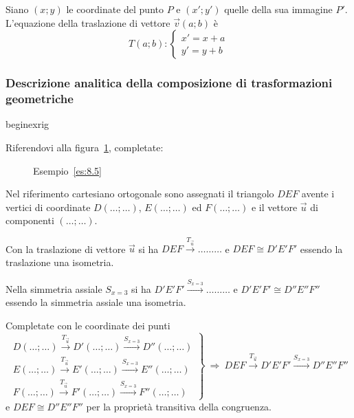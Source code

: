 Siano $(x;y)$ le coordinate del punto $P$ e $(x';y')$ quelle della 
sua immagine $P'$. L'equazione della traslazione di vettore 
$\vec{v}(a;b)$ è
\[T(a;b):\begin{cases}x'=x+a\\y'=y+b\end{cases}\]

\subsubsection{\textbf{Descrizione analitica della composizione di 
trasformazioni geometriche}}
begin{exrig}
\begin{esempio}\label{es:8.5}
Riferendovi alla figura~\ref{fig:es8.5}, completate:


\begin{inaccessibleblock}
\begin{figure}[!htb]
\centering
\caption{Esempio~\ref{es:8.5}}\label{fig:es8.5}
\end{figure}
\end{inaccessibleblock}

Nel riferimento cartesiano ortogonale sono assegnati il triangolo 
$DEF$ avente i vertici di coordinate $D(\ldots{};\ldots{})$, 
$E(\ldots{};\ldots{})$ ed $F(\ldots{};\ldots{})$ e il vettore 
$\vec{u}$ di componenti $(\ldots{};\ldots{})$.

Con la traslazione di vettore $\vec{u}$ si ha $DEF 
\overset{T_{\vec{u}}}\rightarrow \ldots\ldots\ldots{}$ e $DEF\cong 
D'E'F'$ essendo la traslazione una isometria.

Nella simmetria assiale $S_{x=3}$ si ha $D'E'F' 
\overset{S_{x=3}}\longrightarrow \ldots\ldots\ldots{}$ e $D'E'F'\cong 
D''E''F''$ essendo la simmetria assiale una isometria.

Completate con le coordinate dei punti
\[\left.\begin{array}{l}D(\ldots{};\ldots{}) 
\overset{T_{\vec{u}}}\rightarrow 
D'(\ldots{};\ldots{})\overset{S_{x=3}}\longrightarrow 
D''(\ldots{};\ldots{})\\
E(\ldots{};\ldots{}) \overset{T_{\vec{u}}}\rightarrow 
E'(\ldots{};\ldots{})\overset{S_{x=3}}\longrightarrow 
E''(\ldots{};\ldots{})\\
F(\ldots{};\ldots{}) \overset{T_{\vec{u}}}\rightarrow 
F'(\ldots{};\ldots{})\overset{S_{x=3}}\longrightarrow 
F''(\ldots{};\ldots{})\end{array} 
\right\}\:\Rightarrow\:DEF\overset{T_{\vec{u}}}\rightarrow 
D'E'F'\overset{S_{x=3}}\longrightarrow D''E''F''\]
e $DEF\cong D''E''F''$ per la proprietà transitiva della congruenza.
\end{esempio}

